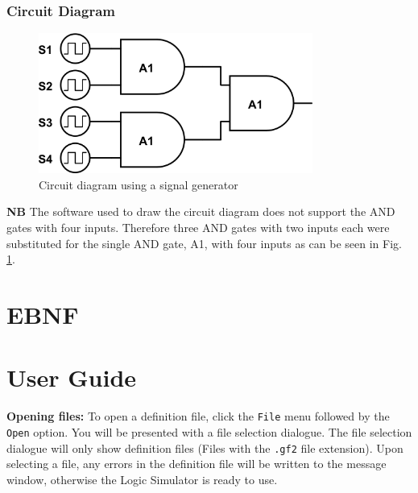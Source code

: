\documentclass[a4paper,10pt]{article}
\begin{document}
\subsubsection{Circuit Diagram}
\begin{figure}[h]
 \centering
 \includegraphics[width=9cm]{../../examples/siggen.png}
 \caption{Circuit diagram using a signal generator}
 \label{fig:example-siggen}
\end{figure}

\textbf{NB} The software used to draw the circuit diagram does not support the AND gates with four inputs. Therefore three AND gates with two inputs each were substituted for the single AND gate, A1, with four inputs as can be seen in Fig. \ref{fig:example-siggen}.

\pagebreak

\section{EBNF}
\label{sec:EBNF}

\pagebreak

\section{User Guide}
\label{sec:guide}

\textbf{Opening files:} To open a definition file, click the \texttt{File} menu followed by the \texttt{Open} option. You will be presented with a file selection dialogue. The file selection dialogue will only show definition files (Files with the \texttt{.gf2} file extension). Upon selecting a file, any errors in the definition file will be written to the message window, otherwise the Logic Simulator is ready to use. 
\end{document}
